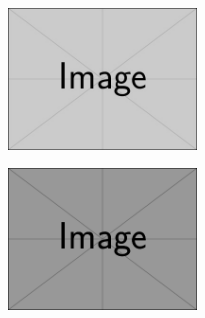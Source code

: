 \documentclass[10pt]{article}
\begin{document}
\includegraphics[width=5cm]{example-image.jpg}

\includegraphics[width=5cm]{example-image.png}
\end{document}
